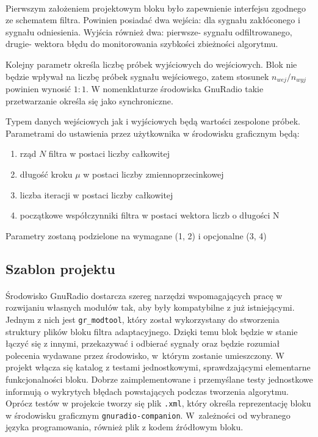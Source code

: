 \paragraph{}
Pierwszym założeniem projektowym bloku było zapewnienie interfejsu zgodnego ze schematem filtra. 
Powinien posiadać dwa wejścia: dla sygnału zakłóconego i sygnału odniesienia. 
Wyjścia również dwa: pierwsze- sygnału odfiltrowanego, drugie- wektora błędu do monitorowania szybkości zbieżności algorytmu.

Kolejny parametr określa liczbę próbek wyjściowych do wejściowych.
Blok nie będzie wpływał na liczbę próbek sygnału wejściowego, zatem stosunek $n_{wej}/n_{wyj}$ powinien wynosić $1:1$. 
W nomenklaturze środowiska GnuRadio takie przetwarzanie określa się jako synchroniczne.

Typem danych wejściowych jak i wyjściowych będą wartości zespolone próbek.
Parametrami do ustawienia przez użytkownika w środowisku graficznym będą:
\begin{enumerate}
 \item rząd $N$ filtra w postaci liczby całkowitej 
 \item długość kroku $\mu$ w postaci liczby zmiennoprzecinkowej
 \item liczba iteracji w postaci liczby całkowitej
 \item początkowe współczynniki filtra w postaci wektora liczb o długości N 
 \end{enumerate}
 
Parametry zostaną podzielone na wymagane (1, 2) i opcjonalne (3, 4)
\subsection{Szablon projektu}
\paragraph{}
Środowisko GnuRadio dostarcza szereg narzędzi wspomagających pracę w rozwijaniu własnych modułów tak, aby były kompatybilne z już istniejącymi. 
Jednym z nich jest \texttt{gr\_modtool}, który został wykorzystany do stworzenia struktury plików bloku filtra adaptacyjnego. 
Dzięki temu blok będzie w stanie łączyć się z innymi, przekazywać i odbierać sygnały oraz będzie rozumiał polecenia wydawane przez środowisko, w~którym zostanie umieszczony. 
W projekt włącza się katalog z testami jednostkowymi, sprawdzającymi elementarne funkcjonalności bloku. 
Dobrze zaimplementowane i przemyślane testy jednostkowe informują o wykrytych błędach powstających podczas tworzenia algorytmu.
Oprócz testów w projekcie tworzy się plik \texttt{.xml}, który określa reprezentację bloku w środowisku graficznym \texttt{gnuradio-companion}. 
W~zależności od wybranego języka programowania, również plik z kodem źródłowym bloku.
